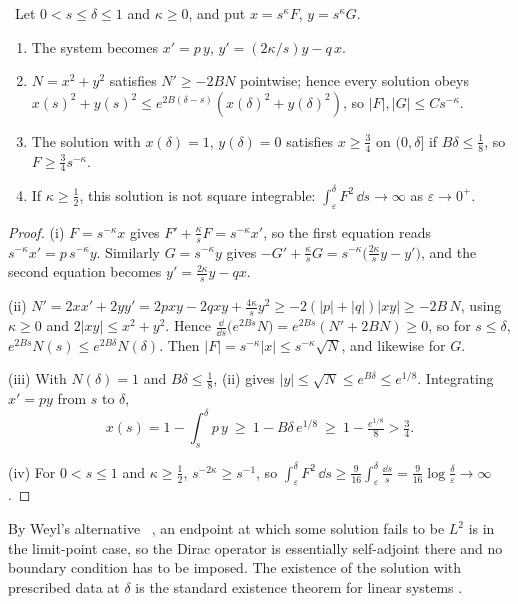 \begin{theorem}\label{thm:limitpoint}\ver\
Let $0<s\le\delta\le1$ and $\kappa\ge0$, and put $x=s^\kappa F$, $y=s^\kappa G$.
\begin{enumerate}[label=(\roman*)]
\item The system becomes $x'=p\,y$, $y'=(2\kappa/s)y-q\,x$.
\item $N=x^2+y^2$ satisfies $N'\ge-2BN$ pointwise; hence every solution obeys $x(s)^2+y(s)^2\le e^{2B(\delta-s)}(x(\delta)^2+y(\delta)^2)$, so $|F|,|G|\le Cs^{-\kappa}$.
\item The solution with $x(\delta)=1$, $y(\delta)=0$ satisfies $x\ge\frac34$ on $(0,\delta]$ if $B\delta\le\frac18$, so $F\ge\frac34s^{-\kappa}$.
\item If $\kappa\ge\frac12$, this solution is not square integrable: $\int_\varepsilon^\delta F^2\,\dd s\to\infty$ as $\varepsilon\to0^+$.
\end{enumerate}
\end{theorem}
\begin{proof}
(i) $F=s^{-\kappa}x$ gives $F'+\frac\kappa sF=s^{-\kappa}x'$, so the first equation reads $s^{-\kappa}x'=p\,s^{-\kappa}y$. Similarly $G=s^{-\kappa}y$ gives $-G'+\frac\kappa sG=s^{-\kappa}\bigl(\frac{2\kappa}sy-y'\bigr)$, and the second equation becomes $y'=\frac{2\kappa}sy-qx$.

(ii) $N'=2xx'+2yy'=2pxy-2qxy+\frac{4\kappa}sy^2\ge-2(|p|+|q|)|xy|\ge-2B\,N$, using $\kappa\ge0$ and $2|xy|\le x^2+y^2$. Hence $\frac{\dd}{\dd s}\bigl(e^{2Bs}N\bigr)=e^{2Bs}(N'+2BN)\ge0$, so for $s\le\delta$, $e^{2Bs}N(s)\le e^{2B\delta}N(\delta)$. Then $|F|=s^{-\kappa}|x|\le s^{-\kappa}\sqrt{N}$, and likewise for $G$.

(iii) With $N(\delta)=1$ and $B\delta\le\frac18$, (ii) gives $|y|\le\sqrt N\le e^{B\delta}\le e^{1/8}$. Integrating $x'=py$ from $s$ to $\delta$,
\[
x(s)=1-\int_s^\delta p\,y\ \ge\ 1-B\delta\,e^{1/8}\ \ge\ 1-\tfrac{e^{1/8}}8>\tfrac34 .
\]

(iv) For $0<s\le1$ and $\kappa\ge\frac12$, $s^{-2\kappa}\ge s^{-1}$, so $\int_\varepsilon^\delta F^2\,\dd s\ge\frac9{16}\int_\varepsilon^\delta\frac{\dd s}s=\frac9{16}\log\frac\delta\varepsilon\to\infty$.
\end{proof}


By Weyl's alternative \ext\ \cite{Weidmann}, an endpoint at which some solution fails to be $L^2$ is in the limit-point case, so the Dirac operator is essentially self-adjoint there and no boundary condition has to be imposed. The existence of the solution with prescribed data at $\delta$ is the standard existence theorem for linear systems \ext.


